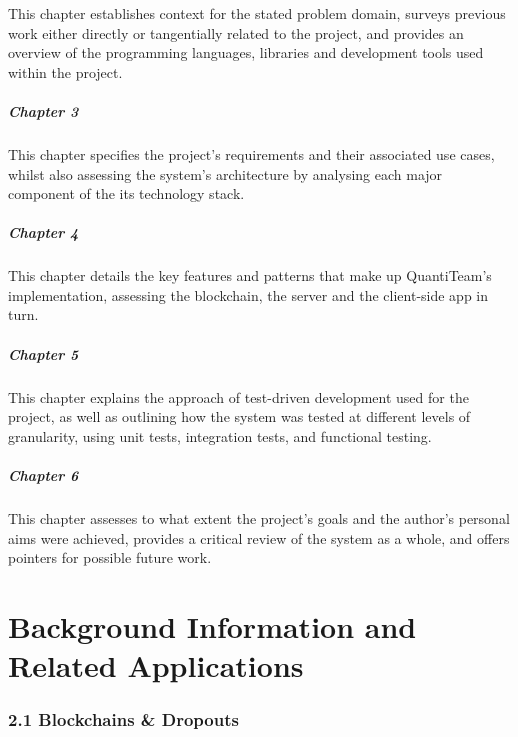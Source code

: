 \documentclass[12pt]{report}
\let\oldparagraph\paragraph
\renewcommand{\paragraph}[1]{\oldparagraph{#1}\mbox{}}
\begin{document}
This chapter establishes context for the stated problem domain, surveys
previous work either directly or tangentially related to the project,
and provides an overview of the programming languages, libraries and
development tools used within the project.

\paragraph{Chapter 3}\label{chapter-3}

This chapter specifies the project's requirements and their associated
use cases, whilst also assessing the system's architecture by analysing
each major component of the its technology stack.

\paragraph{Chapter 4}\label{chapter-4}

This chapter details the key features and patterns that make up
QuantiTeam's implementation, assessing the blockchain, the server and
the client-side app in turn.

\paragraph{Chapter 5}\label{chapter-5}

This chapter explains the approach of test-driven development used for
the project, as well as outlining how the system was tested at different
levels of granularity, using unit tests, integration tests, and
functional testing.

\paragraph{Chapter 6}\label{chapter-6}

This chapter assesses to what extent the project's goals and the
author's personal aims were achieved, provides a critical review of the
system as a whole, and offers pointers for possible future work.

\clearpage

\chapter{Background Information and Related
Applications}

\subsection{2.1 Blockchains \& Dropouts}\label{blockchains-dropouts}
\end{document}
